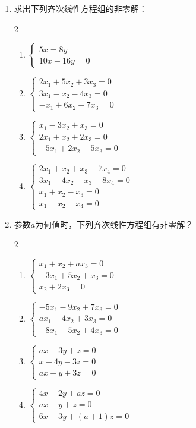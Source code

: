 \begin{enumerate}
\item 求出下列齐次线性方程组的非零解：
\begin{multicols}{2}
    \begin{enumerate}
\item $\begin{cases}
    5x=8y\\ 10x-16y=0
\end{cases}$
\item $\begin{cases}
    2x_1+5x_2+3x_3=0\\3x_1-x_2-4x_3=0\\-x_1+6x_2+7x_3=0
\end{cases}$
\item $\begin{cases}
    x_1-3x_2+x_3=0\\ 2x_1+x_2+2x_3=0\\ -5x_1+2x_2-5x_3=0
\end{cases}$
\item $\begin{cases}
    2x_1+x_2+x_3+7x_4=0\\ 3x_1-4x_2-x_3-8x_4=0\\
    x_1+x_2-x_3=0\\ x_1-x_2-x_4=0
\end{cases}$
    \end{enumerate}
\end{multicols}

\item 参数$a$为何值时，下列齐次线性方程组有非零解？
\begin{multicols}{2}
    \begin{enumerate}
\item $\begin{cases}
   x_1+x_2+ax_3=0\\
-3x_1+5x_2+x_3=0\\
x_2+2x_3=0 
\end{cases}$
\item $\begin{cases}
  -5x_1-9x_2+7x_3=0\\
ax_1-4x_2+3x_3=0\\
-8x_1-5x_2+4x_3=0  
\end{cases}$
\item $\begin{cases}
    ax+3y+z=0\\ x+4y-3z=0\\ ax+y+3z=0
\end{cases}$
\item $\begin{cases}
    4x-2y+az=0 \\ax-y+z=0\\ 6x-3y+ (a+1) z=0   
\end{cases}$
    \end{enumerate}
\end{multicols}


\end{enumerate}
